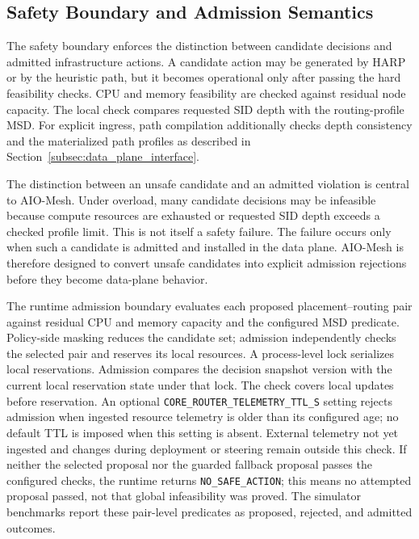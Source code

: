 \documentclass[final,5p]{elsarticle}
\newcommand{\rev}[1]{\textcolor{revisiongreen}{#1}}
\let\newrev\rev
\begin{document}
\subsection{Safety Boundary and Admission Semantics}
\label{subsec:safety_boundary}
\label{subsec:freshness_revalidation}

The safety boundary enforces the distinction between candidate decisions and admitted infrastructure actions. A candidate action may be generated by HARP or by the heuristic path, but it becomes operational only after passing the hard feasibility checks. CPU and memory feasibility are checked against residual node capacity. \newrev{The local check compares requested SID depth with the routing-profile MSD. For explicit ingress, path compilation additionally checks depth consistency and the materialized path profiles as described in Section~\ref{subsec:data_plane_interface}.}

The distinction between an unsafe candidate and an admitted violation is central to AIO-Mesh. Under overload, many candidate decisions may be infeasible because \newrev{compute resources are exhausted or requested SID depth exceeds a checked profile limit}. This is not itself a safety failure. The failure occurs only when such a candidate is admitted and installed in the data plane. AIO-Mesh is therefore designed to convert unsafe candidates into explicit admission rejections before they become data-plane behavior.

\newrev{The runtime admission boundary evaluates each proposed placement--routing pair against residual CPU and memory capacity and the configured MSD predicate. Policy-side masking reduces the candidate set; admission independently checks the selected pair and reserves its local resources. A process-level lock serializes local reservations. Admission compares the decision snapshot version with the current local reservation state under that lock. The check covers local updates before reservation. An optional \texttt{CORE\_ROUTER\_TELEMETRY\_TTL\_S} setting rejects admission when ingested resource telemetry is older than its configured age; no default TTL is imposed when this setting is absent. External telemetry not yet ingested and changes during deployment or steering remain outside this check. If neither the selected proposal nor the guarded fallback proposal passes the configured checks, the runtime returns \texttt{NO\_SAFE\_ACTION}; this means no attempted proposal passed, not that global infeasibility was proved. The simulator benchmarks report these pair-level predicates as proposed, rejected, and admitted outcomes.}
\end{document}
